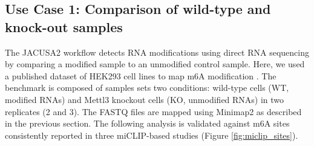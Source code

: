 \documentclass[times, 11pt, a4paper]{article}
\begin{document}
\begin{enumerate}
\end{enumerate}	
\subsection*{Use Case 1: Comparison of wild-type and knock-out samples}
The JACUSA2 workflow detects RNA modifications using direct RNA sequencing by comparing a modified sample to an unmodified control sample. Here, we used a published dataset of HEK293 cell lines to map m6A modification \citep{pratanwanich2021identification}. The benchmark is composed of samples sets two conditions: wild-type cells (WT, modified RNAs) and Mettl3 knockout cells (KO, unmodified RNAs) in two replicates (2 and 3). The FASTQ files are mapped using Minimap2 as described in the previous section. The following analysis is validated against m6A sites consistently reported in three miCLIP-based studies \cite{boulias2019identification,koh2019atlas,kortel2021deep} (Figure \ref{fig:miclip_sites}). 
\end{document}
